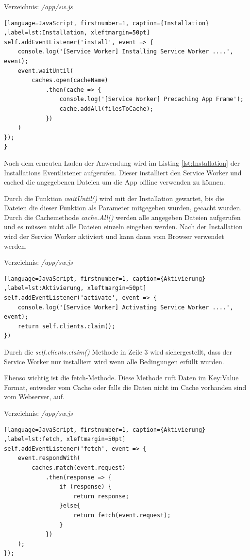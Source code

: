 Verzeichnis: \textit{/app/sw.js}

\begin{lstlisting}[language=JavaScript, firstnumber=1, caption={Installation} ,label=lst:Installation, xleftmargin=50pt]
self.addEventListener('install', event => {
    console.log('[Service Worker] Installing Service Worker ....', event);
    event.waitUntil(
        caches.open(cacheName)
            .then(cache => {
                console.log('[Service Worker] Precaching App Frame');
                cache.addAll(filesToCache);
            })
    )
});
}
\end{lstlisting}

Nach dem erneuten Laden der Anwendung wird im Listing \ref{lst:Installation} der Installations Eventlistener aufgerufen. Dieser installiert den Service Worker und cached die angegebenen Dateien um die App offline verwenden zu können. 

Durch die Funktion \textit{waitUntil()} wird mit der Installation gewartet, bis die Dateien die dieser Funktion als Parameter mitgegeben wurden, gecacht wurden. Durch die Cachemethode \textit{cache.All()} werden alle angegeben Dateien aufgerufen und es müssen nicht alle Dateien einzeln eingeben werden.
Nach der Installation wird der Service Worker aktiviert und kann dann vom Browser verwendet werden.

Verzeichnis: \textit{/app/sw.js}

\begin{lstlisting}[language=JavaScript, firstnumber=1, caption={Aktivierung} ,label=lst:Aktivierung, xleftmargin=50pt]
self.addEventListener('activate', event => {
    console.log('[Service Worker] Activating Service Worker ....', event);
    return self.clients.claim();
})
\end{lstlisting}

Durch die \textit{self.clients.claim()} Methode in Zeile 3 wird sichergestellt, dass der Service Worker nur installiert wird wenn alle Bedingungen erfüllt wurden.

Ebenso wichtig ist die fetch-Methode. Diese Methode ruft Daten im Key:Value Format, entweder vom Cache oder falls die Daten nicht im Cache vorhanden sind vom Webserver, auf.

Verzeichnis: \textit{/app/sw.js}

\begin{lstlisting}[language=JavaScript, firstnumber=1, caption={Aktivierung} ,label=lst:fetch, xleftmargin=50pt]
self.addEventListener('fetch', event => {
    event.respondWith(
        caches.match(event.request)
            .then(response => {
                if (response) {
                    return response;
                }else{
                    return fetch(event.request);
                }
            })
    );
});
\end{lstlisting}

